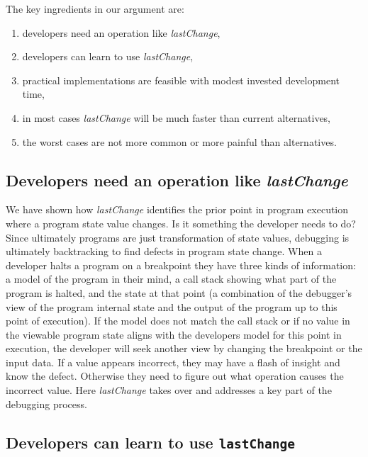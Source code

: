 \documentclass[runningheads,a4paper]{llncs}
\begin{document}
The key ingredients in our argument are: 
\begin{enumerate}
   \item developers need an operation like \textit{lastChange}, 
   \item developers can learn to use \textit{lastChange}, 
   \item practical implementations are feasible with modest
invested development time,
   \item in most cases \textit{lastChange} will be much faster than current alternatives,
   \item the worst cases are not more common or more painful than
alternatives.
\end{enumerate}

\subsection{Developers need an operation like \protect\textit{lastChange} }

We have shown how \textit{lastChange} identifies the prior point in
program execution where a program state value changes. Is it something
the developer needs to do?  Since ultimately programs are just
transformation of state values, debugging is ultimately backtracking
to find defects in program state change.  When a developer halts a
program on a breakpoint they have three kinds of information: a model
of the program in their mind, a call stack showing what part of the
program is halted, and the state at that point (a combination of the
debugger's view of the program internal state and the output of the
program up to this point of execution). If the model does not match
the call stack or if no value in the viewable program state aligns
with the developers model for this point in execution, the developer
will seek another view by changing the breakpoint or the input
data. If a value appears incorrect, they may have a flash of insight
and know the defect. Otherwise they need to figure out what operation
causes the incorrect value. Here \textit{lastChange} takes over and addresses a key
part of the debugging process.

\subsection{Developers can learn to use \protect\texttt{lastChange}}
\end{document}
